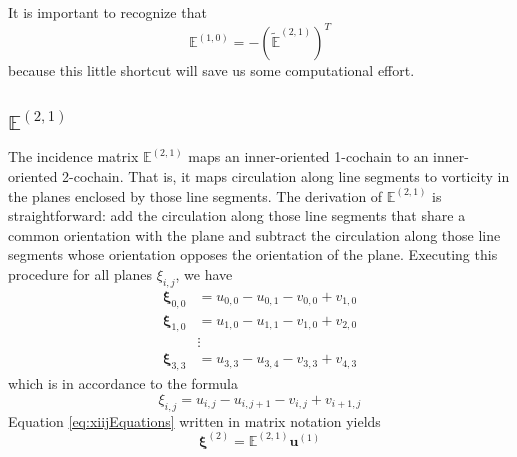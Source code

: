 It is important to recognize that
\begin{equation}
    \mathbb{E}^{(1,0)} = -\left(\tilde{\mathbb{E}}^{(2,1)}\right)^T
\end{equation}
because this little shortcut will save us some computational effort.

\subsection{$\mathbb{E}^{(2,1)}$}

The incidence matrix $\mathbb{E}^{(2,1)}$ maps an inner-oriented 1-cochain to an inner-oriented 2-cochain. That is, it maps circulation along line segments to vorticity in the planes enclosed by those line segments. The derivation of $\mathbb{E}^{(2,1)}$ is straightforward: add the circulation along those line segments that share a common orientation with the plane and subtract the circulation along those line segments whose orientation opposes the orientation of the plane. Executing this procedure for all planes $\xi_{i,j}$, we have
\begin{equation}
    \begin{split}
        \mathbf{\xi}_{0,0} &= u_{0,0} - u_{0,1} - v_{0,0} + v_{1,0} \\
        \mathbf{\xi}_{1,0} &= u_{1,0} - u_{1,1} - v_{1,0} + v_{2,0} \\
        &\vdots \\
        \mathbf{\xi}_{3,3} &= u_{3,3} - u_{3,4} - v_{3,3} + v_{4,3}
    \end{split}
    \label{eq:xiijEquations}
\end{equation}
which is in accordance to the formula
\begin{equation}
    \xi_{i,j} = u_{i,j} - u_{i,j+1} - v_{i,j} + v_{i+1,j}
\end{equation}
Equation \eqref{eq:xiijEquations} written in matrix notation yields
\begin{equation}
    \mathbf{\xi}^{(2)} = \mathbb{E}^{(2,1)} \mathbf{u}^{(1)}
\end{equation}


